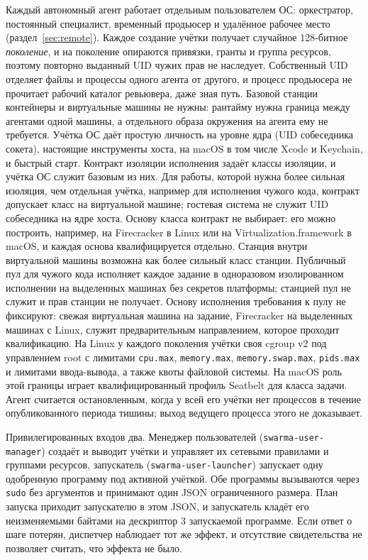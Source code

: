 \documentclass[10pt,a4paper]{article}
\begin{document}
Каждый автономный агент работает отдельным пользователем ОС: оркестратор, постоянный специалист, временный продьюсер и удалённое рабочее место (раздел~\ref{sec:remote}). Каждое создание учётки получает случайное 128-битное \emph{поколение}, и на поколение опираются привязки, гранты и группа ресурсов, поэтому повторно выданный UID чужих прав не наследует. Собственный UID отделяет файлы и процессы одного агента от другого, и процесс продьюсера не прочитает рабочий каталог ревьювера, даже зная путь. Базовой станции контейнеры и виртуальные машины не нужны: рантайму нужна граница между агентами одной машины, а отдельного образа окружения на агента ему не требуется. Учётка ОС даёт простую личность на уровне ядра (UID собеседника сокета), настоящие инструменты хоста, на macOS в том числе Xcode и Keychain, и быстрый старт. Контракт изоляции исполнения задаёт классы изоляции, и учётка ОС служит базовым из них. Для работы, которой нужна более сильная изоляция, чем отдельная учётка, например для исполнения чужого кода, контракт допускает класс на виртуальной машине; гостевая система не служит UID собеседника на ядре хоста. Основу класса контракт не выбирает: его можно построить, например, на Firecracker \cite{firecracker} в Linux или на Virtualization.framework в macOS, и каждая основа квалифицируется отдельно. Станция внутри виртуальной машины возможна как более сильный класс станции. Публичный пул для чужого кода исполняет каждое задание в одноразовом изолированном исполнении на выделенных машинах без секретов платформы; станцией пул не служит и прав станции не получает. Основу исполнения требования к пулу не фиксируют: свежая виртуальная машина на задание, Firecracker на выделенных машинах с Linux, служит предварительным направлением, которое проходит квалификацию. На Linux у каждого поколения учётки своя cgroup v2 под управлением root с лимитами \texttt{cpu.max}, \texttt{memory.max}, \texttt{memory.swap.max}, \texttt{pids.max} и лимитами ввода-вывода, а также квоты файловой системы. На macOS роль этой границы играет квалифицированный профиль Seatbelt для класса задачи. Агент считается остановленным, когда у всей его учётки нет процессов в течение опубликованного периода тишины; выход ведущего процесса этого не доказывает.

Привилегированных входов два. Менеджер пользователей (\texttt{swarma-user-manager}) создаёт и выводит учётки и управляет их сетевыми правилами и группами ресурсов, запускатель (\texttt{swarma-user-launcher}) запускает одну одобренную программу под активной учёткой. Обе программы вызываются через \texttt{sudo} без аргументов и принимают один JSON ограниченного размера. План запуска приходит запускателю в этом JSON, и запускатель кладёт его неизменяемыми байтами на дескриптор 3 запускаемой программе. Если ответ о шаге потерян, диспетчер наблюдает тот же эффект, и отсутствие свидетельства не позволяет считать, что эффекта не было.
\end{document}
